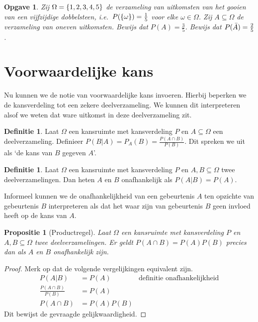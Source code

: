 \documentclass[a4paper]{book}
\newtheorem{proposition}[theorem]{Propositie}
\newtheorem{exercise}[theorem]{Opgave}
\theoremstyle{definition}
\newtheorem{definition}[theorem]{Definitie}
\begin{document}
\begin{exercise}
    Zij $\Omega = \set{1,2,3,4,5}$ de verzameling van uitkomsten van het gooien van een vijfzijdige dobbelsteen,
    i.e.\ $P(\set{\omega}) = \frac{1}{5}$ voor elke $\omega \in \Omega$.
    Zij $A \subseteq \Omega$ de verzameling van oneven uitkomsten.
    Bewijs dat $P(A) = \frac{3}{5}$.
    Bewijs dat $P(\compl{A}) = \frac{2}{5}$.
\end{exercise}


\section{Voorwaardelijke kans}
Nu kunnen we de notie van voorwaardelijke kans invoeren.
Hierbij beperken we de kansverdeling tot een zekere deelverzameling.
We kunnen dit interpreteren alsof we weten dat ware uitkomst in deze deelverzameling zit.
\begin{definition}
    Laat $\Omega$ een kansruimte met kansverdeling $P$ en $A \subseteq \Omega$ een deelverzameling.
    Definieer $P(B|A) = P_A(B) = \frac{P(A \cap B)}{P(B)}$. Dit spreken we uit als `de kans van $B$ gegeven $A$'.
\end{definition}

\begin{definition}
    Laat $\Omega$ een kansruimte met kansverdeling $P$ en $A,B \subseteq \Omega$ twee deelverzamelingen.
    Dan heten $A$ en $B$ onafhankelijk als $P(A|B) = P(A)$.
\end{definition}

Informeel kunnen we de onafhankelijkheid van een gebeurtenis $A$ ten opzichte van gebeurtenis $B$ interpreteren als dat het waar zijn van gebeurtenis $B$
geen invloed heeft op de kans van $A$.

\begin{proposition}[Productregel]
    Laat $\Omega$ een kansruimte met kansverdeling $P$ en $A,B \subseteq \Omega$ twee deelverzamelingen.
    Er geldt $P(A \cap B) = P(A)P(B)$ precies dan als $A$ en $B$ onafhankelijk zijn.
\end{proposition}
\begin{proof}
    Merk op dat de volgende vergelijkingen equivalent zijn.
    \begin{align*}
        P(A|B)                      &= P(A) & \text{definitie onafhankelijkheid}\\
        \frac{P(A \cap B)}{P(B)}    &= P(A) \\
        P(A \cap B)                 &= P(A)P(B)
    \end{align*}
    Dit bewijst de gevraagde gelijkwaardigheid.
\end{proof}
\end{document}
